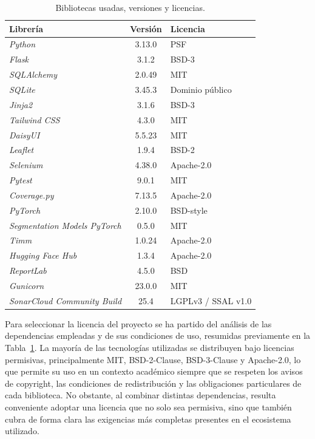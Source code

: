 \begin{table}[]
	\centering
	\small
	\renewcommand{\arraystretch}{1.15}
	
	\begin{tabularx}{\textwidth}{@{}
			>{\RaggedRight\arraybackslash}X
			c
			>{\RaggedRight\arraybackslash}X
			@{}}
		\toprule
		\textbf{Librería} & \textbf{Versión} & \textbf{Licencia} \\
		\midrule
		\textit{Python} & 3.13.0 & PSF \\
		\textit{Flask} & 3.1.2 & BSD-3 \\
		\textit{SQLAlchemy} & 2.0.49 & MIT \\
		\textit{SQLite} & 3.45.3 & Dominio público \\
		\textit{Jinja2} & 3.1.6 & BSD-3 \\
		\textit{Tailwind CSS} & 4.3.0 & MIT \\
		\textit{DaisyUI} & 5.5.23 & MIT \\
		\textit{Leaflet } & 1.9.4 & BSD-2 \\
		\textit{Selenium} & 4.38.0 & Apache-2.0 \\
		\textit{Pytest} & 9.0.1 & MIT \\
		\textit{Coverage.py} & 7.13.5 & Apache-2.0 \\
		\textit{PyTorch} & 2.10.0 & BSD-style \\
		\textit{Segmentation Models PyTorch} & 0.5.0 & MIT \\
		\textit{Timm} & 1.0.24 & Apache-2.0 \\
		\textit{Hugging Face Hub} & 1.3.4 & Apache-2.0 \\
		\textit{ReportLab} & 4.5.0 & BSD \\
		\textit{Gunicorn} & 23.0.0 & MIT \\
		\textit{SonarCloud Community Build} & 25.4 & LGPLv3 / SSAL v1.0 \\
		\bottomrule
	\end{tabularx}
	
	\caption{Bibliotecas usadas, versiones y licencias.}
	\label{tab:licencias_software}
\end{table}

Para seleccionar la licencia del proyecto se ha partido del análisis de las dependencias empleadas y de sus condiciones de uso, resumidas previamente en la Tabla~\ref{tab:licencias_software}. La mayoría de las tecnologías utilizadas se distribuyen bajo licencias permisivas, principalmente MIT, BSD-2-Clause, BSD-3-Clause y Apache-2.0, lo que permite su uso en un contexto académico siempre que se respeten los avisos de copyright, las condiciones de redistribución y las obligaciones particulares de cada biblioteca. No obstante, al combinar distintas dependencias, resulta conveniente adoptar una licencia que no solo sea permisiva, sino que también cubra de forma clara las exigencias más completas presentes en el ecosistema utilizado.

